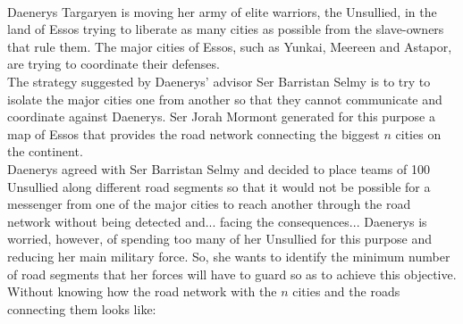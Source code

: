 \documentclass{article}
\begin{document}
\\

 Daenerys Targaryen is moving
her army of elite warriors, the Unsullied, in the land of Essos trying
to liberate as many cities as possible from the slave-owners that rule
them. The major cities of Essos, such as Yunkai, Meereen and Astapor,
are trying to coordinate their defenses.\\

\noindent The strategy suggested by Daenerys' advisor Ser Barristan
Selmy is to try to isolate the major cities one from another so that
they cannot communicate and coordinate against Daenerys. Ser Jorah
Mormont generated for this purpose a map of Essos that provides the
road network connecting the biggest $n$ cities on the continent.\\

\noindent Daenerys agreed with Ser Barristan Selmy and decided to
place teams of 100 Unsullied along different road segments so that it
would not be possible for a messenger from one of the major cities to
reach another through the road network without being detected
and... facing the consequences...  Daenerys is worried, however, of
spending too many of her Unsullied for this purpose and reducing her
main military force. So, she wants to identify the minimum number of
road segments that her forces will have to guard so as to achieve this
objective.\\

\noindent Without knowing how the road network with the $n$ cities and
the roads connecting them looks like:
\end{document}
